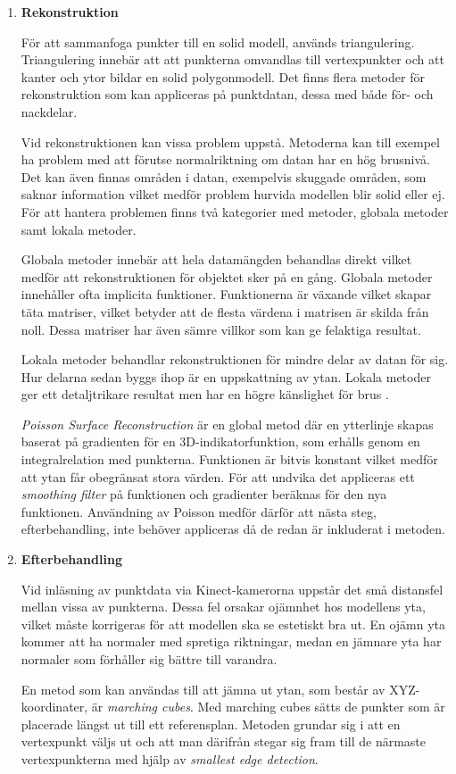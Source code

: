 \documentclass[a4paper,12pt,oneside,final]{extbook}
\begin{document}
\begin{enumerate}
\item \textbf{Rekonstruktion}

För att sammanfoga punkter till en solid modell, används triangulering\cite{pointcloud2surface}. Triangulering innebär att att punkterna omvandlas till vertexpunkter och att kanter och ytor bildar en solid polygonmodell. Det finns flera metoder för rekonstruktion som kan appliceras på punktdatan, dessa med både för- och nackdelar.

Vid rekonstruktionen kan vissa problem uppstå. Metoderna kan till exempel ha problem med att förutse normalriktning om datan har en hög brusnivå. Det kan även finnas områden i datan, exempelvis skuggade områden, som saknar information vilket medför problem hurvida modellen blir solid eller ej. För att hantera problemen finns två kategorier med metoder, globala metoder samt lokala metoder\cite{poisson}.

Globala metoder innebär att hela datamängden behandlas direkt vilket medför att rekonstruktionen för objektet sker på en gång. Globala metoder innehåller ofta implicita funktioner. Funktionerna är växande vilket skapar täta matriser, vilket betyder att de flesta värdena i matrisen är skilda från noll. Dessa matriser har även sämre villkor som kan ge felaktiga resultat\cite{poisson}.

Lokala metoder behandlar rekonstruktionen för mindre delar av datan för sig. Hur delarna sedan byggs ihop är en uppskattning av ytan. Lokala metoder ger ett detaljtrikare resultat men har en högre känslighet för brus \cite{poisson}.

\emph{Poisson Surface Reconstruction} är en global metod där en ytterlinje skapas baserat på gradienten för en 3D-indikatorfunktion, som erhålls genom en integralrelation med punkterna. Funktionen är bitvis konstant vilket medför att ytan får obegränsat stora värden. För att undvika det appliceras ett \emph{smoothing filter} på funktionen och gradienter beräknas för den nya funktionen. Användning av Poisson medför därför att nästa steg, efterbehandling, inte behöver appliceras då de redan är inkluderat i metoden\cite{cluster, poisson}.

\item \textbf{Efterbehandling}

Vid inläsning av punktdata via Kinect-kamerorna uppstår det små distansfel mellan vissa av punkterna. Dessa fel orsakar ojämnhet hos modellens yta, vilket måste korrigeras för att modellen ska se estetiskt bra ut. En ojämn yta kommer att ha normaler med spretiga riktningar, medan en jämnare yta har normaler som förhåller sig bättre till varandra.

En metod som kan användas till att jämna ut ytan, som består av XYZ-koordinater, är \emph{marching cubes}. Med marching cubes sätts de punkter som är placerade längst ut till ett referensplan. Metoden grundar sig i att en vertexpunkt väljs ut och att man därifrån stegar sig fram till de närmaste vertexpunkterna med hjälp av \emph{smallest edge detection}\cite{pointcloud2surface}.

\end{enumerate}
\end{document}
